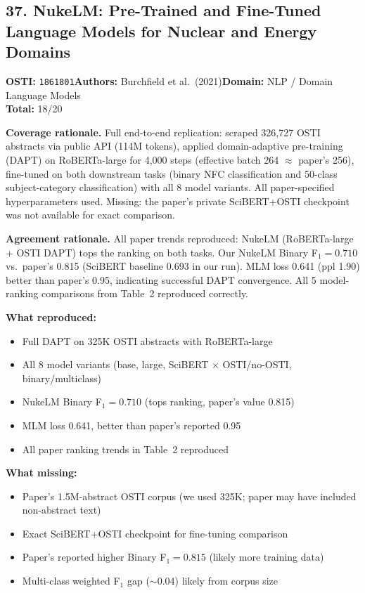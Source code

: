 \subsection{37. NukeLM: Pre-Trained and Fine-Tuned Language Models for Nuclear and Energy Domains}
\textbf{OSTI:} \texttt{1861801}\quad\textbf{Authors:} Burchfield et al.\ (2021)\quad\textbf{Domain:} NLP / Domain Language Models\\
\quad{}\quad\textbf{Total:} 18/20\par\smallskip
\noindent\textbf{Coverage rationale.} Full end-to-end replication: scraped 326,727 OSTI abstracts via public API (114M tokens), applied domain-adaptive pre-training (DAPT) on RoBERTa-large for 4,000 steps (effective batch 264 $\approx$ paper's 256), fine-tuned on both downstream tasks (binary NFC classification and 50-class subject-category classification) with all 8 model variants. All paper-specified hyperparameters used. Missing: the paper's private SciBERT+OSTI checkpoint was not available for exact comparison.\par
\noindent\textbf{Agreement rationale.} All paper trends reproduced: NukeLM (RoBERTa-large + OSTI DAPT) tops the ranking on both tasks. Our NukeLM Binary F$_1=0.710$ vs.\ paper's 0.815 (SciBERT baseline 0.693 in our run). MLM loss 0.641 (ppl 1.90) better than paper's 0.95, indicating successful DAPT convergence. All 5 model-ranking comparisons from Table~2 reproduced correctly.\par\smallskip
\noindent\textbf{What reproduced:}
\begin{itemize}[leftmargin=1.4em,itemsep=0.2em,topsep=0.2em]
\item Full DAPT on 325K OSTI abstracts with RoBERTa-large
\item All 8 model variants (base, large, SciBERT $\times$ OSTI/no-OSTI, binary/multiclass)
\item NukeLM Binary F$_1 = 0.710$ (tops ranking, paper's value 0.815)
\item MLM loss 0.641, better than paper's reported 0.95
\item All paper ranking trends in Table~2 reproduced
\end{itemize}
\noindent\textbf{What missing:}
\begin{itemize}[leftmargin=1.4em,itemsep=0.2em,topsep=0.2em]
\item Paper's 1.5M-abstract OSTI corpus (we used 325K; paper may have included non-abstract text)
\item Exact SciBERT+OSTI checkpoint for fine-tuning comparison
\item Paper's reported higher Binary F$_1 = 0.815$ (likely more training data)
\item Multi-class weighted F$_1$ gap ($\sim$0.04) likely from corpus size
\end{itemize}
